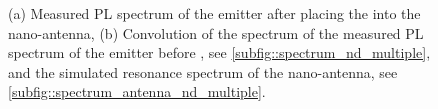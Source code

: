 			\begin{figure}[htp]
				\begin{subfigure}[t]{ 0.49\linewidth}
					\centering
					\caption{}
					\label{subfig::spectrum_antenna_nd_multiple}
				\end{subfigure}
				\hfill
				\begin{subfigure}[t]{ 0.49\linewidth}
					\centering
					\caption{}
					\label{subfig::antenna_convolution}
				\end{subfigure}
				\caption[Spectra of a \nd coupled to an antenna]{(a) Measured PL spectrum of the emitter after placing the \nd into the nano-antenna, (b) Convolution of the spectrum of the measured PL spectrum of the emitter before \pp, see \autoref{subfig::spectrum_nd_multiple}, and the simulated resonance spectrum of the nano-antenna, see \autoref{subfig::spectrum_antenna_nd_multiple}.}
			\end{figure}

